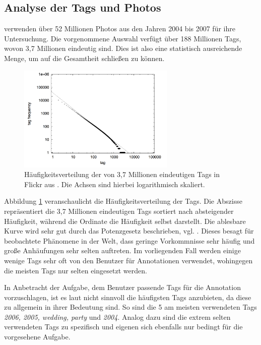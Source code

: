 \subsection{Analyse der Tags und Photos} %
\label{sub:analyse_der_tags}

\cite{collectiveKnowledge} verwenden über 52 Millionen Photos aus den Jahren 2004 bis 2007 für ihre Untersuchung. Die vorgenommene Auswahl verfügt über 188 Millionen Tags, wovon 3,7 Millionen eindeutig sind. Dies ist also eine statistisch ausreichende Menge, um auf die Gesamtheit schließen zu können.

\begin{figure}[htbp]
    \centering
      \includegraphics[height=2in]{images/collectiveKnowledge_tag_frequency.png}
    \caption{Häufigkeitsverteilung der von 3,7 Millionen eindeutigen Tags in Flickr aus \cite{collectiveKnowledge}. Die Achsen sind hierbei logarithmisch skaliert.}
    \label{fig:images_collectiveKnowledge_word_net_categories}
\end{figure}

Abbildung \ref{fig:images_collectiveKnowledge_word_net_categories} veranschaulicht die Häufigkeitsverteilung der Tags. Die Abszisse repräsentiert die 3,7 Millionen eindeutigen Tags sortiert nach absteigender Häufigkeit, während die Ordinate die Häufigkeit selbst darstellt. Die ablesbare Kurve wird sehr gut durch das Potenzgesetz  beschrieben, vgl. \cite{hpParetoPowerLaw}. Dieses besagt für beobachtete Phänomene in der Welt, dass geringe Vorkommnisse sehr häufig und große Anhäufungen sehr selten auftreten. Im vorliegenden Fall werden einige wenige Tags sehr oft von den Benutzer für Annotationen verwendet, wohingegen die meisten Tags nur selten eingesetzt werden.

In Anbetracht der Aufgabe, dem Benutzer passende Tags für die Annotation vorzuschlagen, ist es laut \cite{collectiveKnowledge} nicht sinnvoll die häufigsten Tags anzubieten, da diese zu allgemein in ihrer Bedeutung sind. So sind die 5 am meisten verwendeten Tags \emph{2006, 2005, wedding, party} und \emph{2004}. Analog dazu sind die extrem selten verwendeten Tags zu spezifisch und eigenen sich ebenfalls nur bedingt für die vorgesehene Aufgabe.

